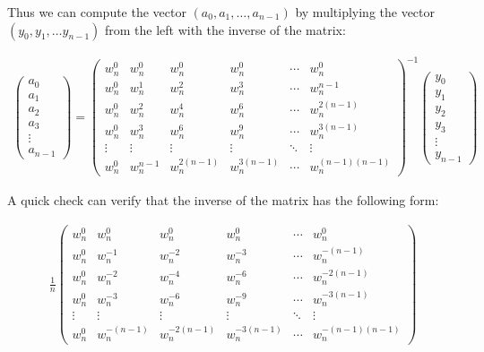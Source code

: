 \documentclass[12pt]{article}
\theoremstyle{definition}
\begin{document}
Thus we can compute the vector $(a_0, a_1, \dots, a_{n-1})$ by multiplying the vector $(y_0, y_1, \dots y_{n-1})$ from the left with the inverse of the matrix:

\begin{align}
\begin{pmatrix}
a_0 \\ a_1 \\ a_2 \\ a_3 \\ \vdots \\ a_{n-1}
\end{pmatrix} = \begin{pmatrix}
w_n^0 & w_n^0 & w_n^0 & w_n^0 & \cdots & w_n^0 \\
w_n^0 & w_n^1 & w_n^2 & w_n^3 & \cdots & w_n^{n-1} \\
w_n^0 & w_n^2 & w_n^4 & w_n^6 & \cdots & w_n^{2(n-1)} \\
w_n^0 & w_n^3 & w_n^6 & w_n^9 & \cdots & w_n^{3(n-1)} \\
\vdots & \vdots & \vdots & \vdots & \ddots & \vdots \\
w_n^0 & w_n^{n-1} & w_n^{2(n-1)} & w_n^{3(n-1)} & \cdots & w_n^{(n-1)(n-1)}
\end{pmatrix}^{-1} \begin{pmatrix}
y_0 \\ y_1 \\ y_2 \\ y_3 \\ \vdots \\ y_{n-1}
\end{pmatrix}
\end{align}


A quick check can verify that the inverse of the matrix has the following form:

\begin{align}
\frac{1}{n}
\begin{pmatrix}
w_n^0 & w_n^0 & w_n^0 & w_n^0 & \cdots & w_n^0 \\
w_n^0 & w_n^{-1} & w_n^{-2} & w_n^{-3} & \cdots & w_n^{-(n-1)} \\
w_n^0 & w_n^{-2} & w_n^{-4} & w_n^{-6} & \cdots & w_n^{-2(n-1)} \\
w_n^0 & w_n^{-3} & w_n^{-6} & w_n^{-9} & \cdots & w_n^{-3(n-1)} \\
\vdots & \vdots & \vdots & \vdots & \ddots & \vdots \\
w_n^0 & w_n^{-(n-1)} & w_n^{-2(n-1)} & w_n^{-3(n-1)} & \cdots & w_n^{-(n-1)(n-1)}
\end{pmatrix}
\end{align}
\end{document}
